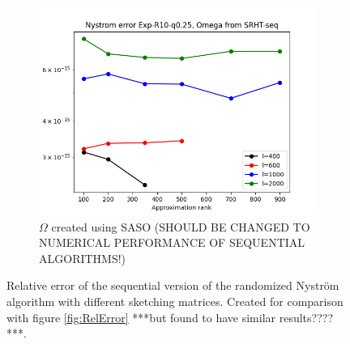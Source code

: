 \documentclass{article}
\theoremstyle{definition}
\begin{document}
\begin{appendices}
\begin{figure}
\begin{subfigure}[t]{0.35\textwidth}
    \includegraphics[width=\textwidth]{plots/relerror/relerror_Exp-R10-q0.25_SRHT-seq.png}
    \caption{$\Omega$ created using SASO (SHOULD BE CHANGED TO NUMERICAL PERFORMANCE OF SEQUENTIAL ALGORITHMS!)}
\end{subfigure}\hfill
\caption{Relative error of the sequential version of the randomized Nyström algorithm with different sketching matrices. Created for comparison with figure \ref{fig:RelError} ***but found to have similar results????***.}
\label{fig:SequentialRelError}
\end{figure}
\end{appendices}
\end{document}
